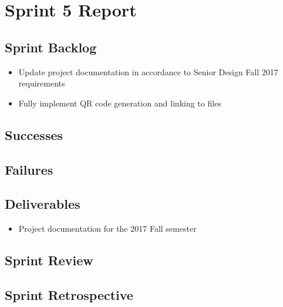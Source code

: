
\section{Sprint 5 Report}
\label{sec:Sprint5_report}
    \subsection{Sprint Backlog}
    \label{sec:Sprint5_backlog}
        \begin{itemize}
            \item Update project documentation in accordance to Senior Design Fall 2017 requirements
            \item Fully implement QR code generation and linking to files
        \end{itemize}

    \subsection{Successes}
    \label{sec:Sprint5_successes}

    \subsection{Failures}
    \label{sec:Sprint5_failures}

    \subsection{Deliverables}
    \label{sec:Sprint5_deliverables}
    \begin{itemize}
        \item Project documentation for the 2017 Fall semester
    \end{itemize}

    \subsection{Sprint Review}
    \label{sec:Sprint5_review}

    \subsection{Sprint Retrospective}
    \label{sec:Sprint5_retrospective}
